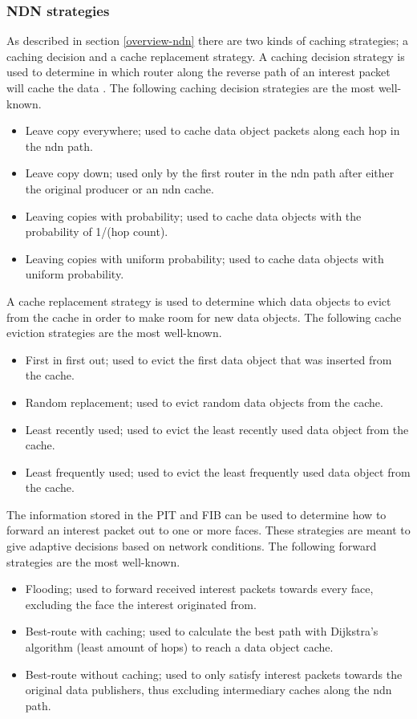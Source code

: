 \subsubsection{NDN strategies}
As described in section \ref{overview-ndn} there are two kinds of caching strategies; a caching decision and a cache replacement strategy. A caching decision strategy is used to determine in which router along the reverse path of an interest packet will cache the data \cite{koulouzis2018information}. The following caching decision strategies are the most well-known.

\begin{itemize}
    \item Leave copy everywhere; used to cache data object packets along each hop in the \gls{ndn} path.
    \item Leave copy down; used only by the first router in the \gls{ndn} path after either the original producer or an \gls{ndn} cache.
    \item Leaving copies with probability; used to cache data objects with the probability of 1/(hop count).
    \item Leaving copies with uniform probability; used to cache data objects with uniform probability.
\end{itemize}

A cache replacement strategy is used to determine which data objects to evict from the cache in order to make room for new data objects. The following cache eviction strategies are the most well-known.
\begin{itemize}
    \item First in first out; used to evict the first data object that was inserted from the cache.
    \item Random replacement; used to evict random data objects from the cache.
    \item Least recently used; used to evict the least recently used data object from the cache.
    \item Least frequently used; used to evict the least frequently used data object from the cache.
\end{itemize}

The information stored in the PIT and FIB can be used to determine how to forward an interest packet out to one or more faces. These strategies are meant to give adaptive decisions based on network conditions. The following forward strategies are the most well-known.
\begin{itemize}
    \item Flooding; used to forward received interest packets towards every face, excluding the face the interest originated from.
    \item Best-route with caching; used to calculate the best path with Dijkstra's algorithm (least amount of hops) to reach a data object cache.
    \item Best-route without caching; used to only satisfy interest packets towards the original data publishers, thus excluding intermediary caches along the \gls{ndn} path.
\end{itemize}

